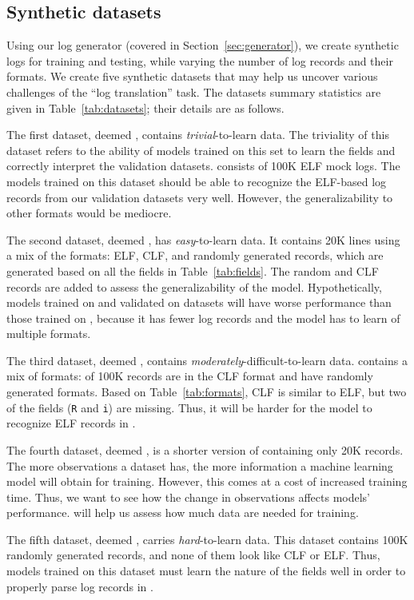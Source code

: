 \documentclass{article}
\begin{document}
\subsection{Synthetic datasets} \label{sec:synth_data}

Using our log generator (covered in Section~\ref{sec:generator}), we create synthetic logs for training and testing, while varying the number of log records and their formats. We create five synthetic datasets that may help us uncover various challenges of the ``log translation'' task. The datasets summary statistics are given in Table~\ref{tab:datasets}; their details are as follows.

The first dataset, deemed , contains \textit{trivial}-to-learn data. 
The triviality of this dataset refers to the ability of models trained on this set to learn the fields and correctly interpret the validation datasets.  consists of 100K ELF mock logs. The models trained on this dataset should be able to recognize the ELF-based log records from our validation datasets very well. However, the generalizability to other formats would be mediocre.

The second dataset, deemed , has \textit{easy}-to-learn data. 
It contains 20K lines using a mix of the formats: ELF, CLF, and randomly generated records, which are generated based on all the fields in Table~\ref{tab:fields}. The random and CLF records are added to assess the generalizability of the model. Hypothetically, models trained on  and validated on  datasets will have worse performance than those trained on , because it has fewer log records and the model has to learn of multiple formats.

The third dataset, deemed , contains \textit{moderately}-difficult-to-learn data.
 contains a mix of formats:  of 100K records are in the CLF format and  have randomly generated formats. Based on  Table~\ref{tab:formats},  CLF is similar to ELF, but two of the fields (\texttt{R} and \texttt{i}) are missing. Thus, it will be harder for the model to recognize ELF records in . 

The fourth dataset, deemed , is a shorter version of  containing only 20K records. The more observations a dataset has, the more information a machine learning model will obtain for training. However, this comes at a cost of increased training time. Thus, we want to see how the change in observations affects models' performance.
  will help us assess how much data are needed for training. 

The fifth dataset, deemed , carries \textit{hard}-to-learn data. 
This dataset contains 100K randomly generated records, and none of them look like CLF or ELF. Thus, models trained on this dataset must learn the nature of the fields well in order to properly parse log records in .
\end{document}
